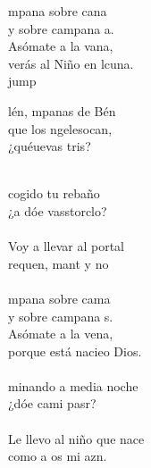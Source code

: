 \begin{cancion}%
	mpana sobre cana\\
	y sobre campana a.\\
	Asómate a la vana,\\
	verás al Niño en lcuna.\\jump\\
	\begin{chorus}%
	lén, mpanas de Bén\\
	que los ngelesocan,\\
	¿quéuevas tris?  \\
	\end{chorus}%
	\jump\\
	cogido tu rebaño\\
	¿a dóe vasstorclo? \\
	\jump\\
Voy a llevar al portal\\
	requen, mant y no \\
	\jump\\
	mpana sobre cama\\
	y sobre campana s.\\
	Asómate a la vena,\\
	porque está nacieo Dios.\\
	\jump\\
	minando a media noche\\
	¿dóe cami pasr? \\
	\jump\\
Le llevo al niño que nace\\
	como a os mi azn.\\
\end{cancion}%
